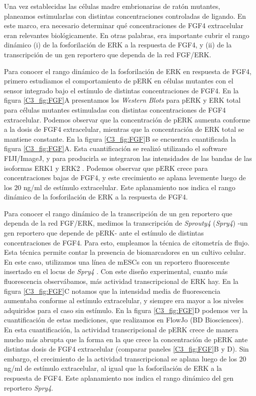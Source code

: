 \documentclass[./main.tex]{subfiles}
\begin{document}
Una vez establecidas las células madre embrionarias de ratón mutantes, planeamos estimularlas con distintas concentraciones controladas de ligando. En este marco, era necesario determinar qué concentraciones de FGF4 extracelular eran relevantes biológicamente. En otras palabras, era importante cubrir el rango dinámico (i) de la fosforilación de ERK a la respuesta de FGF4, y (ii) de la transcripción de un gen reportero que dependa de la red FGF/ERK. 


Para conocer el rango dinámico de la fosforilación de ERK en respuesta de FGF4, primero estudiamos el comportamiento de pERK en células mutantes con el sensor integrado bajo el estímulo de distintas concentraciones de FGF4. En la figura \ref{C3_fig:FGF}A presentamos los \textit{Western Blots} para pERK y ERK total para células mutantes estimuladas con distintas concentraciones de FGF4 extracelular. Podemos observar que la concentración de pERK aumenta conforme a la dosis de FGF4 extracelular, mientras que la concentración de ERK total se mantiene constante. En la figura \ref{C3_fig:FGF}B se encuentra cuantificada la figura \ref{C3_fig:FGF}A. Esta cuantificación se realizó utilizando el software FIJI/ImageJ, y para producirla se integraron las intensidades de las bandas de las isoformas ERK1 y ERK2 \cite{Rueden2017}. Podemos observar que pERK crece para concentraciones bajas de FGF4, y este crecimiento se aplana levemente luego de los $20$ ng/ml de estímulo extracelular. Este aplanamiento nos indica el rango dinámico de la fosforilación de ERK a la respuesta de FGF4.


Para conocer el rango dinámico de la transcripción de un gen reportero que dependa de la red FGF/ERK, medimos la transcripción de \textit{Sprouty4} (\textit{Spry4}) -un gen reportero que depende de pERK- ante el estímulo de distintas concentraciones de FGF4. Para esto, empleamos la técnica de citometría de flujo. Esta técnica permite contar la presencia de biomarcadores en un cultivo celular. En este caso, utilizamos una línea de mESCs con un reportero fluorescente insertado en el locus de \textit{Spry4} \cite{Morgani2018}. Con este diseño experimental, cuanto más fluorescencia observábamos, más actividad transcripcional de ERK hay. En la figura \ref{C3_fig:FGF}C notamos que la intensidad media de fluorescencia aumentaba conforme al estímulo extracelular, y siempre era mayor a los niveles adquiridos para el caso sin estímulo. En la figura \ref{C3_fig:FGF}D podemos ver la cuantificación de estas mediciones, que realizamos en FlowJo (BD Biosciences). En esta cuantificación, la actividad transcripcional de pERK crece de manera mucho más abrupta que la forma en la que crece la concentración de pERK ante distintas dosis de FGF4 extracelular (comparar paneles \ref{C3_fig:FGF}B y D). Sin embargo, el crecimiento de la actividad transcripcional se aplana luego de los $20$ ng/ml de estímulo extracelular, al igual que la fosforilación de ERK a la respuesta de FGF4. Este aplanamiento nos indica el rango dinámico del gen reportero \textit{Spry4}.
\end{document}
